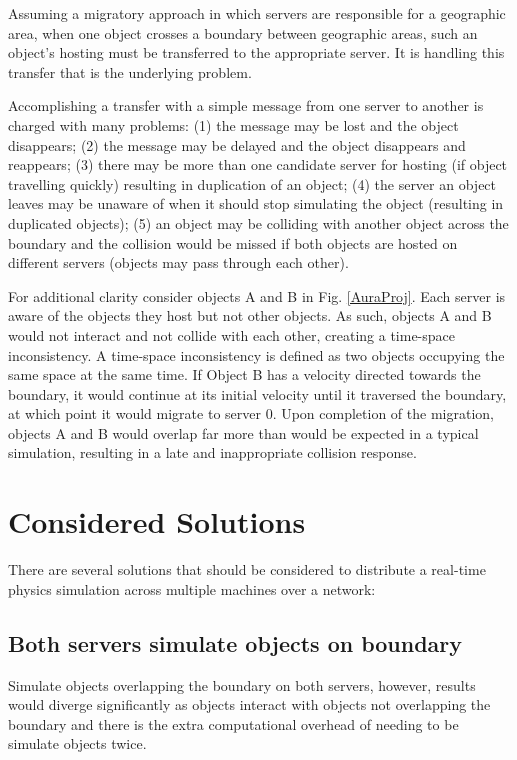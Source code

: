 Assuming a migratory approach in which servers are responsible for a geographic area, when one object crosses a boundary between geographic areas, such an object's hosting must be transferred to the appropriate server. It is handling this transfer that is the underlying problem.

Accomplishing a transfer with a simple message from one server to another is charged with many problems: (1) the message may be lost and the object disappears; (2) the message may be delayed and the object disappears and reappears; (3) there may be more than one candidate server for hosting (if object travelling quickly) resulting in duplication of an object; (4) the server an object leaves may be unaware of when it should stop simulating the object (resulting in duplicated objects)\cite{High-performanceServerSystems}; (5) an object may be colliding with another object across the boundary and the collision would be missed if both objects are hosted on different servers (objects may pass through each other).

For additional clarity consider objects A and B in Fig. \ref{AuraProj}. Each server is aware of the objects they host but not other objects. As such, objects A and B would not interact and not collide with each other, creating a time-space inconsistency. A time-space inconsistency is defined as two objects occupying the same space at the same time. If Object B has a velocity directed towards the boundary, it would continue at its initial velocity until it traversed the boundary, at which point it would migrate to server 0. Upon completion of the migration, objects A and B would overlap far more than would be expected in a typical simulation, resulting in a late and inappropriate collision response.

\section{Considered Solutions}\label{ConsideredSolutions}
There are several solutions that should be considered to distribute a real-time physics simulation across multiple machines over a network:

\subsection{Both servers simulate objects on boundary}
Simulate objects overlapping the boundary on both servers, however, results would diverge significantly as objects interact with objects not overlapping the boundary and there is the extra computational overhead of needing to be simulate objects twice.

